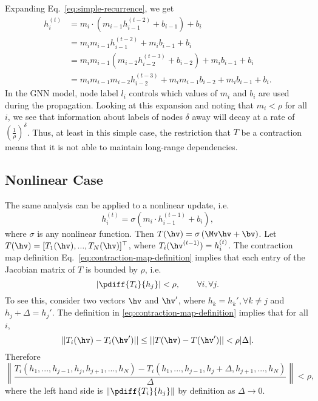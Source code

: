 Expanding Eq.~\ref{eq:simple-recurrence}, we get
\begin{align}
  h_i^{(t)} & = m_{i} \cdot (m_{i-1} h_{i-1}^{(t-2)} + b_{i-1}) + b_{i}
    \nonumber\\
            & = m_{i} m_{i-1} h_{i-1}^{(t-2)} + m_{i} b_{i-1} + b_{i}
    \nonumber\\
            & = m_{i} m_{i-1} (m_{i-2} h_{i-2}^{(t-3)} + b_{i-2}) + m_{i}
    b_{i-1} + b_{i} \nonumber\\
            & = m_{i} m_{i-1} m_{i-2} h_{i-2}^{(t-3)} + m_{i} m_{i-1} b_{i-2} + m_{i} b_{i-1} + b_{i}.
\end{align}
%
In the GNN model, node label $l_i$ controls which values of $m_i$
and $b_i$ are used during the propagation. Looking at this expansion
and noting that $m_i < \rho$ for all $i$, we see that information about
labels of nodes $\delta$ away will decay at a rate of
$\left(\frac{1}{\rho}\right)^\delta$.
Thus, at least in this simple case, the restriction that $T$ be
a contraction means that it is not able to maintain long-range
dependencies.

\subsection{Nonlinear Case}

The same analysis can be applied to a nonlinear update, i.e.
\begin{equation}
    h^{(t)}_i = \sigma\left(m_i \cdot h^{(t-1)}_{i-1} + b_i\right),
\end{equation}
where $\sigma$ is any nonlinear function. Then $T(\hv) =
\sigma\left(\Mv\hv + \bv\right)$. Let $T(\hv)=[T_1(\hv), ...,
T_N(\hv)]^\top$, where $T_i(\hv^{(t-1)}) = h_i^{(t)}$. The contraction map
definition Eq.~\ref{eq:contraction-map-definition} implies that each entry of
the Jacobian matrix of $T$ is bounded by $\rho$, i.e.
\begin{equation}
    \left|\pdiff{T_i}{h_j}\right| < \rho, \qquad \forall i, \forall j.
\end{equation}
To see this, consider two vectors $\hv$ and $\hv'$, where $h_k=h_k', \forall
k\neq j$ and $h_j + \Delta = h_j'$. The definition in
\eqref{eq:contraction-map-definition} implies that for all $i$,
\begin{equation}
    ||T_i(\hv) - T_i(\hv')|| \le ||T(\hv) - T(\hv')|| < \rho |\Delta|.
\end{equation}
Therefore
\begin{equation}
\left\|\frac{T_i(h_1, ..., h_{j-1}, h_j, h_{j+1}, ..., h_N) - T_i(h_1, ...,
h_{j-1}, h_j+\Delta, h_{j+1}, ..., h_N)}{\Delta}\right\| < \rho,
\end{equation}
where the left hand side is $\left\|\pdiff{T_i}{h_j}\right\|$ by definition as
$\Delta\rightarrow 0$.

